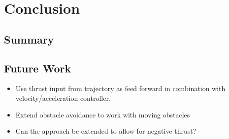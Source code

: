 \chapter{Conclusion}
\section{Summary}
\section{Future Work}
\begin{itemize}
    \item Use thrust input from trajectory as feed forward in combination with velocity/acceleration controller.
    \item Extend obstacle avoidance to work with moving obstacles
    \item Can the approach be extended to allow for negative thrust?
\end{itemize}
